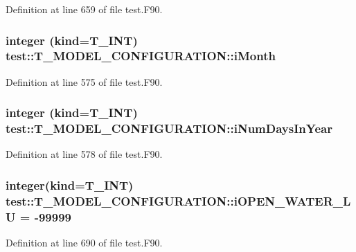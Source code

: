 Definition at line 659 of file test.F90.

\hypertarget{typetest_1_1_t___m_o_d_e_l___c_o_n_f_i_g_u_r_a_t_i_o_n_a22846dd71b4bccd8a1c00043437ac3f2}{
\subsubsection[{iMonth}]{\setlength{\rightskip}{0pt plus 5cm}integer (kind={\bf T\_\-INT}) {\bf test::T\_\-MODEL\_\-CONFIGURATION::iMonth}}}
\label{typetest_1_1_t___m_o_d_e_l___c_o_n_f_i_g_u_r_a_t_i_o_n_a22846dd71b4bccd8a1c00043437ac3f2}


Definition at line 575 of file test.F90.

\hypertarget{typetest_1_1_t___m_o_d_e_l___c_o_n_f_i_g_u_r_a_t_i_o_n_aab5b98a166cd8c8d894db495d6a58b16}{
\subsubsection[{iNumDaysInYear}]{\setlength{\rightskip}{0pt plus 5cm}integer (kind={\bf T\_\-INT}) {\bf test::T\_\-MODEL\_\-CONFIGURATION::iNumDaysInYear}}}
\label{typetest_1_1_t___m_o_d_e_l___c_o_n_f_i_g_u_r_a_t_i_o_n_aab5b98a166cd8c8d894db495d6a58b16}


Definition at line 578 of file test.F90.

\hypertarget{typetest_1_1_t___m_o_d_e_l___c_o_n_f_i_g_u_r_a_t_i_o_n_a285c5ca0adeeda71575803ee388aab9a}{
\subsubsection[{iOPEN\_\-WATER\_\-LU}]{\setlength{\rightskip}{0pt plus 5cm}integer(kind={\bf T\_\-INT}) {\bf test::T\_\-MODEL\_\-CONFIGURATION::iOPEN\_\-WATER\_\-LU} = -\/99999}}
\label{typetest_1_1_t___m_o_d_e_l___c_o_n_f_i_g_u_r_a_t_i_o_n_a285c5ca0adeeda71575803ee388aab9a}


Definition at line 690 of file test.F90.

